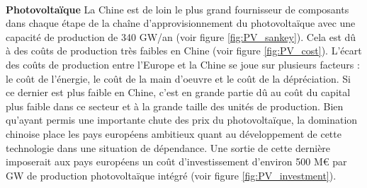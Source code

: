 \label{VAENR}
~\\
\textbf{Photovoltaïque}
\smallbreak
La Chine est de loin le plus grand fournisseur de composants dans chaque étape de la chaîne d'approvisionnement du photovoltaïque avec une capacité de production de 340 GW/an (voir figure \ref{fig:PV_sankey}). Cela est dû à des coûts de production très faibles en Chine (voir figure \ref{fig:PV_cost}). L'écart des coûts de production entre l'Europe et la Chine se joue sur plusieurs facteurs : le coût de l'énergie, le coût de la main d'oeuvre et le coût de la dépréciation. Si ce dernier est plus faible en Chine, c'est en grande partie dû au coût du capital plus faible dans ce secteur et à la grande taille des unités de production.\smallbreak
Bien qu'ayant permis une importante chute des prix du photovoltaïque, la domination chinoise place les pays européens ambitieux quant au développement de cette technologie dans une situation de dépendance. Une sortie de cette dernière imposerait aux pays européens un coût d'investissement d'environ 500 M€ par GW de production photovoltaïque intégré (voir figure \ref{fig:PV_investment}).

